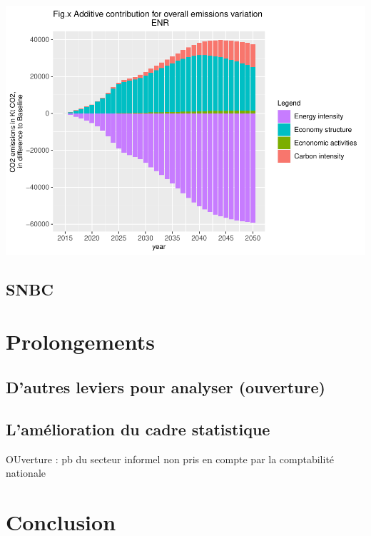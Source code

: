 \documentclass[
]{article}
\begin{document}
\includegraphics{Modele-ThreeMe-Tunisie_Sequeira_Valilou_Wang_files/figure-latex/unnamed-chunk-36-1.pdf}

\hypertarget{snbc-1}{%
\subsection{SNBC}\label{snbc-1}}

\hypertarget{prolongements}{%
\section{Prolongements}\label{prolongements}}

\hypertarget{dautres-leviers-pour-analyser-ouverture}{%
\subsection{D'autres leviers pour analyser
(ouverture)}\label{dautres-leviers-pour-analyser-ouverture}}

\hypertarget{lamuxe9lioration-du-cadre-statistique}{%
\subsection{L'amélioration du cadre
statistique}\label{lamuxe9lioration-du-cadre-statistique}}

OUverture : pb du secteur informel non pris en compte par la
comptabilité nationale

\hypertarget{conclusion}{%
\section{Conclusion}\label{conclusion}}

\printbibliography[title=Bibliographie]
\end{document}
